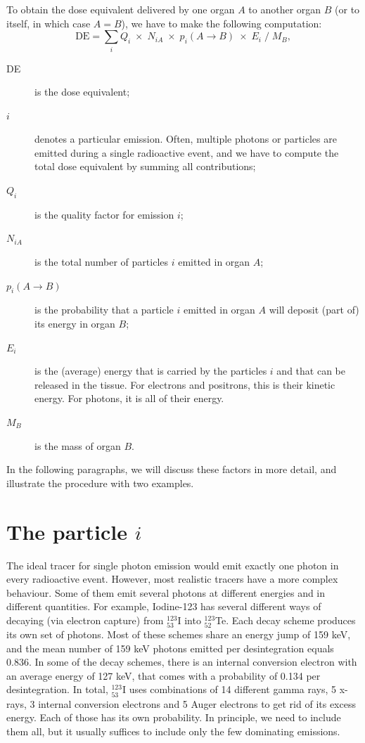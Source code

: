 \documentclass[11pt,oneside]{book}
\begin{document}
To obtain the dose equivalent delivered by one organ $A$ to another organ $B$
(or to itself, in which case $A = B$), we have to make the following
computation:
\begin{equation}
  \mbox{DE} = \sum_i Q_i \;\times\; N_{iA} \;\times\; p_i(A \rightarrow B) 
               \;\times\; E_i \;/\; M_B, \label{eq:DE}
\end{equation}
\begin{description}
  \item[DE] is the dose equivalent;

  \item[$i$] denotes a particular emission. Often, multiple photons or
            particles are emitted during a single radioactive event, and we
            have to compute the total dose equivalent by summing all
            contributions;

  \item[$Q_i$] is the quality factor for emission $i$;

  \item[$N_{iA}$] is the total number of particles $i$ emitted in organ $A$;

  \item[$p_i(A \rightarrow B)$] is the probability that a particle $i$ emitted
       in organ $A$ will deposit (part of) its energy in organ $B$;

  \item[$E_i$] is the (average) energy that is carried by the particles $i$ and
       that can be released in the tissue. For electrons and positrons, this is
       their kinetic energy. For photons, it is all of their energy.

  \item[$M_B$] is the mass of organ $B$.
\end{description}
In the following paragraphs, we will discuss these factors in more detail, and
illustrate the procedure with two examples.

\section{The particle $i$}
The ideal tracer for single photon emission would emit exactly one photon in
every radioactive event. However, most realistic tracers have a more complex
behaviour. Some of them emit several photons at different energies and in
different quantities. For example, Iodine-123 has several different ways of
decaying (via electron capture) from $^{123}_{53}$I into $^{123}_{52}$Te.
Each decay scheme produces its
own set of photons. Most of these schemes share an energy jump of 159 keV, and
the mean number of 159 keV photons emitted per desintegration equals
0.836. In some of the decay schemes, there is an internal conversion electron
with an average energy of 127 keV, that comes with a probability of 0.134 per
desintegration. In total,
$^{123}_{53}$I uses combinations of 14 different gamma rays, 5 x-rays, 3
internal conversion electrons and 5 Auger electrons to get rid of its excess
energy. Each of those has its own probability. In principle, we need to
include them all, but it usually suffices to include only the few dominating
emissions.
\end{document}
